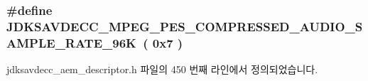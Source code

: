 \subsubsection[{\texorpdfstring{J\+D\+K\+S\+A\+V\+D\+E\+C\+C\+\_\+\+M\+P\+E\+G\+\_\+\+P\+E\+S\+\_\+\+C\+O\+M\+P\+R\+E\+S\+S\+E\+D\+\_\+\+A\+U\+D\+I\+O\+\_\+\+S\+A\+M\+P\+L\+E\+\_\+\+R\+A\+T\+E\+\_\+96K}{JDKSAVDECC_MPEG_PES_COMPRESSED_AUDIO_SAMPLE_RATE_96K}}]{\setlength{\rightskip}{0pt plus 5cm}\#define J\+D\+K\+S\+A\+V\+D\+E\+C\+C\+\_\+\+M\+P\+E\+G\+\_\+\+P\+E\+S\+\_\+\+C\+O\+M\+P\+R\+E\+S\+S\+E\+D\+\_\+\+A\+U\+D\+I\+O\+\_\+\+S\+A\+M\+P\+L\+E\+\_\+\+R\+A\+T\+E\+\_\+96K~( 0x7 )}\hypertarget{group__mpeg__pes__compressed__audio__sample__rate_gab7cbc66c81966afb4fb2c596988ded4b}{}\label{group__mpeg__pes__compressed__audio__sample__rate_gab7cbc66c81966afb4fb2c596988ded4b}


jdksavdecc\+\_\+aem\+\_\+descriptor.\+h 파일의 450 번째 라인에서 정의되었습니다.

